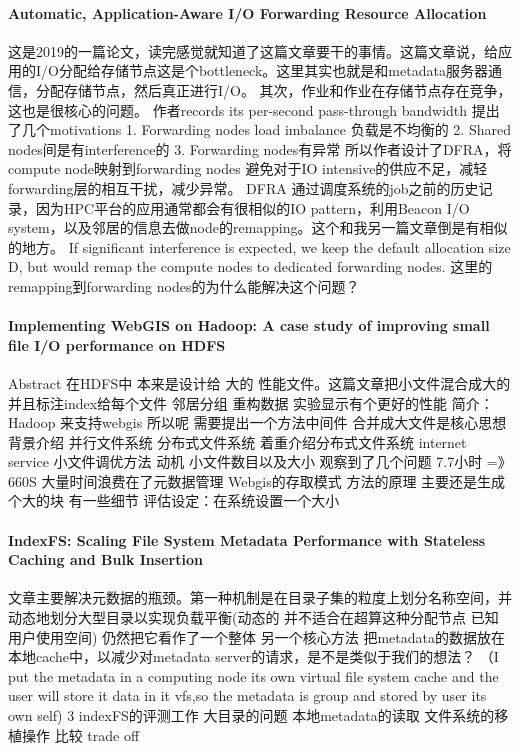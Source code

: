 \documentclass[8pt,UTF8]{article}
\begin{document}
            \paragraph{Automatic, Application-Aware I/O Forwarding Resource Allocation}
                这是2019的一篇论文，读完感觉就知道了这篇文章要干的事情。这篇文章说，给应用的I/O分配给存储节点这是个bottleneck。这里其实也就是和metadata服务器通信，分配存储节点，然后真正进行I/O。 其次，作业和作业在存储节点存在竞争，这也是很核心的问题。 作者records its per-second pass-through bandwidth 提出了几个motivations 1.	Forwarding nodes load imbalance 负载是不均衡的 2.	Shared nodes间是有interference的 3.	Forwarding nodes有异常
                所以作者设计了DFRA，将compute node映射到forwarding nodes 避免对于IO intensive的供应不足，减轻forwarding层的相互干扰，减少异常。 DFRA 通过调度系统的job之前的历史记录，因为HPC平台的应用通常都会有很相似的IO pattern，利用Beacon I/O system，以及邻居的信息去做node的remapping。这个和我另一篇文章倒是有相似的地方。 If significant interference is expected, we keep the default allocation size D, but would remap the compute nodes to dedicated forwarding nodes. 这里的remapping到forwarding nodes的为什么能解决这个问题？
            \paragraph{Implementing WebGIS on Hadoop: A case study of improving small file I/O performance on HDFS}
                Abstract 在HDFS中 本来是设计给 大的 性能文件。这篇文章把小文件混合成大的 并且标注index给每个文件 邻居分组 重构数据 实验显示有个更好的性能
                简介： Hadoop 来支持webgis  所以呢 需要提出一个方法中间件 合并成大文件是核心思想
                背景介绍 并行文件系统 分布式文件系统 着重介绍分布式文件系统 internet service 小文件调优方法 动机 小文件数目以及大小 观察到了几个问题 7.7小时 =》 660S 大量时间浪费在了元数据管理 Webgis的存取模式 方法的原理 主要还是生成个大的块 有一些细节 评估设定：在系统设置一个大小
            \paragraph{IndexFS: Scaling File System Metadata Performance with Stateless Caching and Bulk Insertion}
                文章主要解决元数据的瓶颈。第一种机制是在目录子集的粒度上划分名称空间，并动态地划分大型目录以实现负载平衡(动态的 并不适合在超算这种分配节点 已知用户使用空间) 仍然把它看作了一个整体 另一个核心方法 把metadata的数据放在本地cache中，以减少对metadata server的请求，是不是类似于我们的想法？ （I put the metadata in a computing node its own virtual file system cache and the user will store it data in it vfs,so the metadata is group and stored by user its own self) 3 indexFS的评测工作 大目录的问题 本地metadata的读取 文件系统的移植操作 比较 trade off
\end{document}

